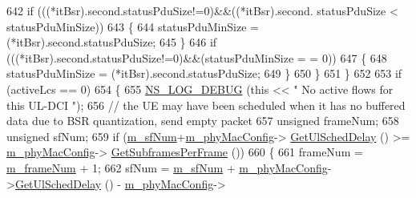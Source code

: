 \begin{DoxyCode}
642                                                 \textcolor{keywordflow}{if} (((*itBsr).second.statusPduSize!=0)&&((*itBsr).second.
      statusPduSize < statusPduMinSize))
643                                                 \{
644                                                         statusPduMinSize = (*itBsr).second.statusPduSize;
645                                                 \}
646                                                 \textcolor{keywordflow}{if} (((*itBsr).second.statusPduSize!=0)&&(statusPduMinSize =
      = 0))
647                                                 \{
648                                                         statusPduMinSize = (*itBsr).second.statusPduSize;
649                                                 \}
650                                         \}
651                                 \}
652 
653                                 \textcolor{keywordflow}{if} (activeLcs == 0)
654                                 \{
655                                         \hyperlink{group__logging_ga413f1886406d49f59a6a0a89b77b4d0a}{NS\_LOG\_DEBUG} (\textcolor{keyword}{this} << \textcolor{stringliteral}{" No active flows for this UL-DCI
      "});
656                                         \textcolor{comment}{// the UE may have been scheduled when it has no buffered data due
       to BSR quantization, send empty packet}
657                                         \textcolor{keywordtype}{unsigned} frameNum;
658                                         \textcolor{keywordtype}{unsigned} sfNum;
659                                         \textcolor{keywordflow}{if} (\hyperlink{classns3_1_1MmWaveUeMac_a6502efe66b636fe976c308a9edac3627}{m\_sfNum}+\hyperlink{classns3_1_1MmWaveUeMac_a24c07c6453f442e2e818803190371a46}{m\_phyMacConfig}->
      \hyperlink{classns3_1_1MmWavePhyMacCommon_afd70935ec71838fefe6a8e18198f19cb}{GetUlSchedDelay} () >= \hyperlink{classns3_1_1MmWaveUeMac_a24c07c6453f442e2e818803190371a46}{m\_phyMacConfig}->
      \hyperlink{classns3_1_1MmWavePhyMacCommon_a3709cf52f6813eb8ad1af16d95082dc1}{GetSubframesPerFrame} ())
660                                         \{
661                                                 frameNum = \hyperlink{classns3_1_1MmWaveUeMac_aff3b4a35e6f83bd3762e0d1187475717}{m\_frameNum} + 1;
662                                                 sfNum = \hyperlink{classns3_1_1MmWaveUeMac_a6502efe66b636fe976c308a9edac3627}{m\_sfNum} + 
      \hyperlink{classns3_1_1MmWaveUeMac_a24c07c6453f442e2e818803190371a46}{m\_phyMacConfig}->\hyperlink{classns3_1_1MmWavePhyMacCommon_afd70935ec71838fefe6a8e18198f19cb}{GetUlSchedDelay} () - \hyperlink{classns3_1_1MmWaveUeMac_a24c07c6453f442e2e818803190371a46}{m\_phyMacConfig}->

\end{DoxyCode}
